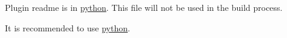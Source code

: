 Plugin readme is in \hyperlink{md_src_plugins_python_README_src_plugins_python_README_md}{python}. This file will not be used in the build process.

It is recommended to use \hyperlink{md_src_plugins_python_README_src_plugins_python_README_md}{python}. 